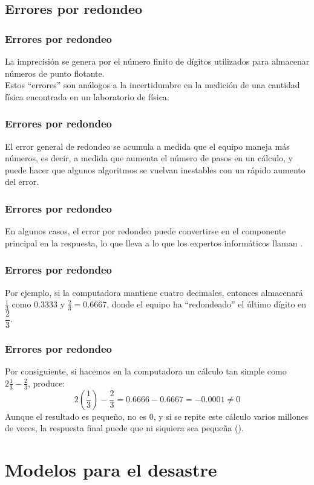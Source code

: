 \documentclass[12pt]{beamer}
\begin{document}
\subsection{Errores por redondeo}

\begin{frame}
\frametitle{Errores por redondeo}
La imprecisión se genera por el número finito de dígitos utilizados para almacenar números de punto flotante.
\\
\bigskip
\pause
Estos \enquote{errores} son análogos a la incertidumbre en la medición de una cantidad física encontrada en un laboratorio de física.
\end{frame}
\begin{frame}
\frametitle{Errores por redondeo}
El error general de redondeo se acumula a medida que el equipo maneja más números, es decir, a medida que aumenta el número de pasos en un cálculo, y puede hacer que algunos algoritmos se vuelvan inestables con un rápido aumento del error.
\end{frame}
\begin{frame}
\frametitle{Errores por redondeo}
En algunos casos, el error por redondeo puede convertirse en el componente principal en la respuesta, lo que lleva a lo que los expertos informáticos llaman .
\end{frame}
\begin{frame}
\frametitle{Errores por redondeo}
Por ejemplo, si la computadora mantiene cuatro decimales, entonces almacenará $\frac{1}{3}$ como $0.3333$ y $\frac{2}{3} = 0.6667$, donde el equipo ha \enquote{redondeado} el último dígito en $\dfrac{2}{3}$.
\end{frame}
\begin{frame}
\frametitle{Errores por redondeo}
Por consiguiente, si hacemos en la computadora un cálculo tan simple como $2 \frac{1}{3} - \frac{2}{3}$, produce:
\pause
\begin{equation}
2 \left( \dfrac{1}{3} \right) - \dfrac{2}{3} = 0.6666 - 0.6667 = -0.0001 \neq 0
\label{eq:ecuacion_02_03}
\end{equation}
\pause
Aunque el resultado es pequeño, no es $0$, y si se repite este cálculo varios millones de veces, \pause la respuesta final puede que ni siquiera sea pequeña ().
\end{frame}

\section{Modelos para el desastre}
\end{document}
